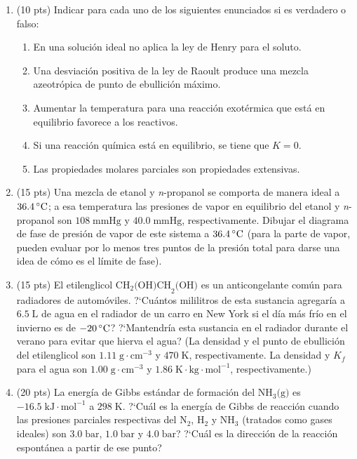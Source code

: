 \documentclass[a4paper,12pt]{article}
\begin{document}
\begin{enumerate}

 \item (10 pts) Indicar para cada uno de los siguientes enunciados si es verdadero o falso: %
\begin{enumerate}
 \item En una soluci\'on ideal no aplica la ley de Henry para el soluto.
 \item Una desviaci\'on positiva de la ley de Raoult produce una mezcla azeotr\'opica de punto de ebullici\'on m\'aximo.
 \item Aumentar la temperatura para una reacci\'on exot\'ermica que est\'a en equilibrio favorece a los reactivos.
 \item Si una reacci\'on qu\'imica est\'a en equilibrio, se tiene que $K=0$.
 \item Las propiedades molares parciales son propiedades extensivas.
\end{enumerate}

 \item (15 pts) Una mezcla de etanol y \emph{n}-propanol se comporta de manera ideal a $36.4\,\celsius$; a esa temperatura las presiones de vapor en equilibrio del etanol y \emph{n}-propanol son $108\;\mbox{mmHg}$ y $40.0\;\mbox{mmHg}$, respectivamente. Dibujar el diagrama de fase de presi\'on de vapor de este sistema a $36.4\,\celsius$ (para la parte de vapor, pueden evaluar por lo menos tres puntos de la presi\'on total para darse una idea de c\'omo es el l\'imite de fase). %

 \item (15 pts) El etilenglicol $\mbox{CH}_2\mbox{(OH)CH}_2\mbox{(OH)}$ es un anticongelante com\'un para radiadores de autom\'oviles. ?`Cu\'antos mililitros de esta sustancia agregar\'ia a $6.5\;\mbox{L}$ de agua en el radiador de un carro en New York si el d\'ia m\'as fr\'io en el invierno es de $-20\,\celsius$? ?`Mantendr\'ia esta sustancia en el radiador durante el verano para evitar que hierva el agua? (La densidad y el punto de ebullici\'on del etilenglicol son $1.11\;\mbox{g}\cdot\mbox{cm}^{-3}$ y $470\;\mbox{K}$, respectivamente. La densidad y $K_f$ para el agua son $1.00\;\mbox{g}\cdot\mbox{cm}^{-3}$ y $1.86\;\mbox{K}\cdot\mbox{kg}\cdot\mbox{mol}^{-1}$, respectivamente.) %

 \item (20 pts) La energ\'ia de Gibbs est\'andar de formaci\'on del $\mbox{NH}_3\mbox{(g)}$ es $-16.5\;\mbox{kJ}\cdot\mbox{mol}^{-1}$ a $298\;\mbox{K}$. ?`Cu\'al es la energ\'ia de Gibbs de reacci\'on cuando las presiones parciales respectivas del $\mbox{N}_2$, $\mbox{H}_2$ y $\mbox{NH}_3$ (tratados como gases ideales) son $3.0\;\mbox{bar}$, $1.0\;\mbox{bar}$ y $4.0\;\mbox{bar}$? ?`Cu\'al es la direcci\'on de la reacci\'on espont\'anea a partir de ese punto? %


\end{enumerate}
\end{document}
